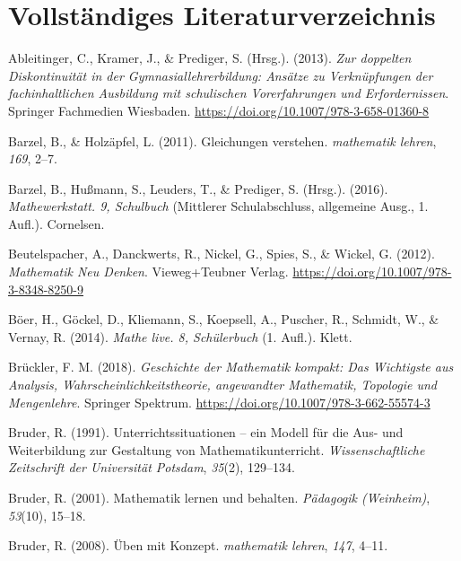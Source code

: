 \documentclass[
]{scrbook}
\newlength{\cslhangindent}
\newenvironment{CSLReferences}[2] %
 {\begin{list}{}{%
  \setlength{\itemindent}{0pt}
  \setlength{\leftmargin}{0pt}
  \setlength{\parsep}{0pt}
  \ifodd #1
   \setlength{\leftmargin}{\cslhangindent}
   \setlength{\itemindent}{-1\cslhangindent}
  \fi
  \setlength{\itemsep}{#2\baselineskip}}}
 {\end{list}}
\theoremstyle{definition}
\theoremstyle{definition}
\theoremstyle{definition}
\theoremstyle{definition}
\theoremstyle{remark}
\begin{document}
\chapter{Vollständiges Literaturverzeichnis}\label{vollstuxe4ndiges-literaturverzeichnis}

\label{refs}
\begin{CSLReferences}{1}{0}
Ableitinger, C., Kramer, J., \& Prediger, S. (Hrsg.). (2013). \emph{Zur doppelten {Diskontinuität} in der {Gymnasiallehrerbildung}: {Ansätze} zu {Verknüpfungen} der fachinhaltlichen {Ausbildung} mit schulischen {Vorerfahrungen} und {Erfordernissen}}. Springer Fachmedien Wiesbaden. \url{https://doi.org/10.1007/978-3-658-01360-8}

Barzel, B., \& Holzäpfel, L. (2011). Gleichungen verstehen. \emph{mathematik lehren}, \emph{169}, 2--7.

Barzel, B., Hußmann, S., Leuders, T., \& Prediger, S. (Hrsg.). (2016). \emph{Mathewerkstatt. 9, {Schulbuch}} (Mittlerer Schulabschluss, allgemeine Ausg., 1. Aufl.). Cornelsen.

Beutelspacher, A., Danckwerts, R., Nickel, G., Spies, S., \& Wickel, G. (2012). \emph{Mathematik {Neu} {Denken}}. Vieweg+Teubner Verlag. \url{https://doi.org/10.1007/978-3-8348-8250-9}

Böer, H., Göckel, D., Kliemann, S., Koepsell, A., Puscher, R., Schmidt, W., \& Vernay, R. (2014). \emph{Mathe live. 8, {Schülerbuch}} (1. Aufl.). Klett.

Brückler, F. M. (2018). \emph{Geschichte der {Mathematik} kompakt: {Das} {Wichtigste} aus {Analysis}, {Wahrscheinlichkeitstheorie}, angewandter {Mathematik}, {Topologie} und {Mengenlehre}}. Springer Spektrum. \url{https://doi.org/10.1007/978-3-662-55574-3}

Bruder, R. (1991). Unterrichtssituationen -- ein {Modell} für die {Aus}- und {Weiterbildung} zur {Gestaltung} von {Mathematikunterricht}. \emph{Wissenschaftliche Zeitschrift der Universität Potsdam}, \emph{35}(2), 129--134.

Bruder, R. (2001). Mathematik lernen und behalten. \emph{Pädagogik (Weinheim)}, \emph{53}(10), 15--18.

Bruder, R. (2008). Üben mit {Konzept}. \emph{mathematik lehren}, \emph{147}, 4--11.


\end{CSLReferences}
\end{document}

